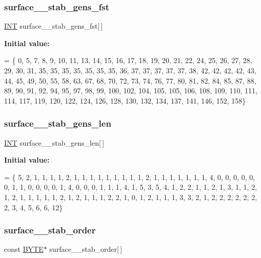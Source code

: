 \subsubsection{\texorpdfstring{surface\+\_\+\_\+stab\+\_\+gens\+\_\+fst}{surface\_64\_stab\_gens\_fst}}
{\footnotesize\ttfamily \mbox{\hyperlink{galois_8h_a09fddde158a3a20bd2dcadb609de11dc}{I\+NT}} surface\+\_\+\_\+stab\+\_\+gens\+\_\+fst\mbox{[}$\,$\mbox{]}}

{\bfseries Initial value\+:}
\begin{DoxyCode}
= \{ 0, 5, 7, 8, 9, 10, 11, 13, 14, 15, 
    16, 17, 18, 19, 20, 21, 22, 24, 25, 26, 
    27, 28, 29, 30, 31, 35, 35, 35, 35, 35, 
    35, 35, 36, 37, 37, 37, 37, 37, 38, 42, 
    42, 42, 42, 43, 44, 45, 49, 50, 55, 58, 
    63, 67, 68, 70, 72, 73, 74, 76, 77, 80, 
    81, 82, 84, 85, 87, 88, 89, 90, 91, 92, 
    94, 95, 97, 98, 99, 100, 102, 104, 105, 105, 
    106, 108, 109, 110, 111, 114, 117, 119, 120, 122, 
    124, 126, 128, 130, 132, 134, 137, 141, 146, 152, 
    158\}
\end{DoxyCode}
\mbox{\label{surface__64_8_c_a40e11c1aec32dfa8b08b1dee57ee696d}} 
\subsubsection{\texorpdfstring{surface\+\_\+\_\+stab\+\_\+gens\+\_\+len}{surface\_64\_stab\_gens\_len}}
{\footnotesize\ttfamily \mbox{\hyperlink{galois_8h_a09fddde158a3a20bd2dcadb609de11dc}{I\+NT}} surface\+\_\+\_\+stab\+\_\+gens\+\_\+len\mbox{[}$\,$\mbox{]}}

{\bfseries Initial value\+:}
\begin{DoxyCode}
= \{ 5, 2, 1, 1, 1, 1, 2, 1, 1, 1, 
    1, 1, 1, 1, 1, 1, 2, 1, 1, 1, 
    1, 1, 1, 1, 4, 0, 0, 0, 0, 0, 
    0, 1, 1, 0, 0, 0, 0, 1, 4, 0, 
    0, 0, 1, 1, 1, 4, 1, 5, 3, 5, 
    4, 1, 2, 2, 1, 1, 2, 1, 3, 1, 
    1, 2, 1, 2, 1, 1, 1, 1, 1, 2, 
    1, 2, 1, 1, 1, 2, 2, 1, 0, 1, 
    2, 1, 1, 1, 3, 3, 2, 1, 2, 2, 
    2, 2, 2, 2, 2, 3, 4, 5, 6, 6, 
    12\}
\end{DoxyCode}
\mbox{\label{surface__64_8_c_aae9cb638cccd4e11420d9976e6bc54e1}} 
\subsubsection{\texorpdfstring{surface\+\_\+\_\+stab\+\_\+order}{surface\_64\_stab\_order}}
{\footnotesize\ttfamily const \mbox{\hyperlink{galois_8h_ab6cc7b4aeb6ea31aba2b3fbfc83ff5e6}{B\+Y\+TE}}$\ast$ surface\+\_\+\_\+stab\+\_\+order\mbox{[}$\,$\mbox{]}}

